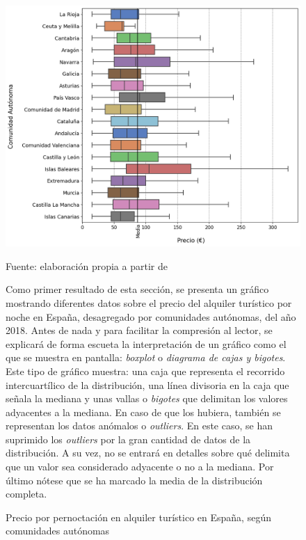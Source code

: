 \documentclass[a4paper,10pt]{article}
\begin{document}
            \begin{figure}[ht]
                \begin{flushleft}
                    \includegraphics*[width = 15cm]{graphics/spain_2018_price.png}
                    \begin{flushright}
                        \footnotesize{Fuente: elaboración propia a partir de \cite[(1)]{datahippo} }
                    \end{flushright}
                    \caption{Precio por pernoctación en alquiler turístico en España, según comunidades autónomas}
                \end{flushleft}


                Como primer resultado de esta sección, se presenta un gráfico mostrando diferentes datos sobre el precio del alquiler turístico por noche en España, desagregado por comunidades autónomas, del año 2018. Antes de nada y para facilitar la compresión al lector, se explicará de forma escueta la interpretación de un gráfico como el que se muestra en pantalla: \textit{boxplot} o \textit{diagrama de cajas y bigotes}. Este tipo de gráfico muestra:
                una caja que representa el recorrido intercuartílico de la distribución, una línea divisoria en la caja que señala la mediana y unas vallas o \textit{bigotes} que delimitan los valores adyacentes a la mediana. En caso de que los hubiera, también se representan los datos anómalos o \textit{outliers}. En este caso, se han suprimido los \textit{outliers} por la gran cantidad de datos de la distribución. A su vez, no se entrará en detalles sobre qué delimita que un valor sea considerado adyacente o no a la mediana. Por último nótese que se ha marcado la media de la distribución completa.\\


\end{figure}
\end{document}
